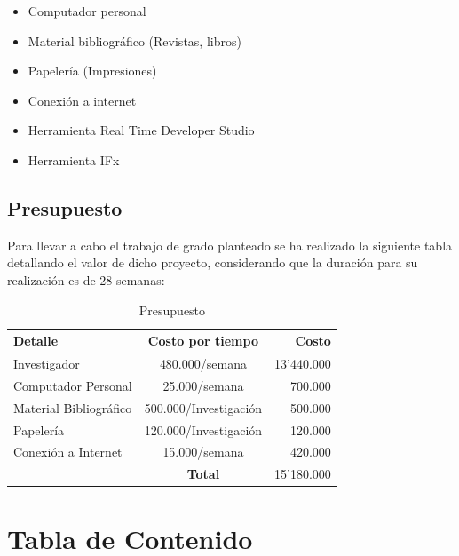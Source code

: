 \begin{itemize}
 \item Computador personal
 \item Material bibliogr\'afico (Revistas, libros)
 \item Papeler\'ia (Impresiones)
\item Conexi\'on a internet
\item Herramienta Real Time Developer Studio 
\item Herramienta IFx
\end{itemize}

\subsection{Presupuesto}

Para llevar a cabo el trabajo de grado planteado se ha realizado la siguiente 
tabla detallando el valor de dicho proyecto, considerando que la duraci\'on para 
su realizaci\'on es de 28  semanas:

\begin{table}[H]
  \centering
  \begin{tabular}{|l|c|r|}
    \hline \hline
    \textbf{Detalle} & \textbf{Costo por tiempo} & \textbf{Costo} \\ 
    \hline
    Investigador                   & 480.000/semana & 13'440.000 \\ \hline
    Computador Personal            & 25.000/semana & 700.000\\ \hline
    Material Bibliogr\'afico       & 500.000/Investigaci\'on & 500.000\\ \hline
    Papeler\'ia  & 120.000/Investigaci\'on & 120.000\\ \hline
    Conexi\'on a Internet & 15.000/semana& 420.000 \\ \hline
    \hline
    \hfill &  \textbf{Total}           & 15'180.000 \\
    \hline
  \end{tabular}
  \caption{Presupuesto}
  \label{tab:presupuesto}
\end{table}

\section{Tabla de Contenido}

